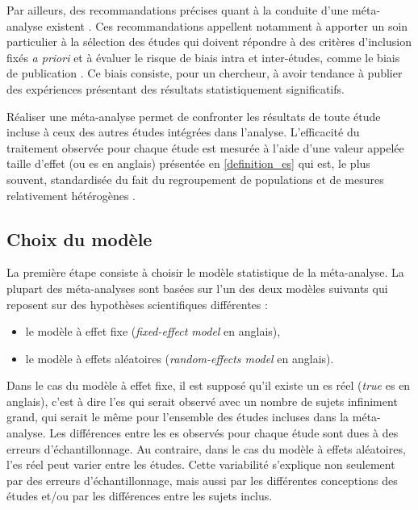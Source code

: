 Par ailleurs, des recommandations précises quant à la conduite d'une méta-analyse existent \citep{Moher2009, Cochrane}. Ces recommandations
appellent notamment à apporter un soin particulier à la sélection des études qui doivent répondre à des critères d'inclusion fixés 
\textit{a priori} et à évaluer le risque de biais intra et inter-études, comme le biais de publication \citep{Higgins2011}. Ce biais consiste, 
pour un chercheur, à avoir tendance à publier des expériences présentant des résultats statistiquement significatifs.  

Réaliser une méta-analyse permet de confronter les résultats de toute étude incluse à ceux des autres études intégrées dans l'analyse.
L'efficacité du traitement observée pour chaque étude est mesurée à l'aide d'une valeur appelée taille 
d'effet (ou \gls{es} en anglais) présentée en \ref{definition_es} qui est, le plus souvent, standardisée du fait du regroupement de 
populations et de mesures relativement hétérogènes \citep{Cortese2016}.

\subsection{Choix du modèle} \label{model_choice}

La première étape consiste à choisir le modèle statistique de la méta-analyse. La plupart des méta-analyses sont basées sur l'un des deux modèles 
suivants qui reposent sur des hypothèses scientifiques différentes \citep[Chapitre~10]{Borenstein2009} :
\begin{itemize}
\item le modèle à effet fixe (\textit{fixed-effect model} en anglais),
\item le modèle à effets aléatoires (\textit{random-effects model} en anglais).
\end{itemize}

Dans le cas du modèle à effet fixe, il est supposé qu'il existe un \gls{es} réel (\textit{true} \gls{es} en anglais), c'est à dire l'\gls{es} qui serait
observé avec un nombre de sujets infiniment grand, qui serait le même pour l'ensemble des études incluses dans la méta-analyse. Les différences entre
les \gls{es} observés pour chaque étude sont dues à des erreurs d'échantillonnage. Au contraire, dans le cas du modèle à effets aléatoires, 
l'\gls{es} réel peut varier entre les études. Cette variabilité s'explique non seulement par des erreurs d'échantillonnage, mais aussi par 
les différentes conceptions des études et/ou par les différences entre les sujets inclus.

